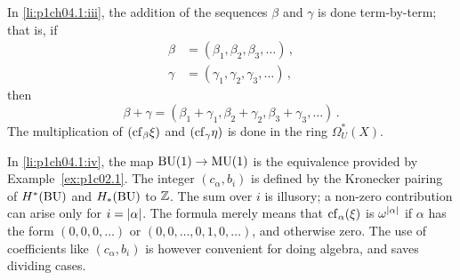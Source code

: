 \documentclass[../main]{subfiles}
\begin{document}
\begin{explanation}
In \ref{li:p1ch04.1:iii}, the addition of the sequences $\beta$ and $\gamma$ is done term-by-term; 
that is, if 
\begin{equation*}
\begin{split}
	\beta &= (\beta_1, \beta_2, \beta_3, \ldots)\,,\\
	\gamma &= (\gamma_1, \gamma_2, \gamma_3, \ldots)\,,
\end{split}
\end{equation*}
then
\begin{equation*}
	\beta + \gamma = (\beta_1 + \gamma_1, \beta_2 + \gamma_2, \beta_3 + \gamma_3, \ldots)\,.
\end{equation*} 
The multiplication of $(\mathrm{cf}_\beta \xi)$ and $(\mathrm{cf}_\gamma \eta)$ is done in the ring $\Omega_U^\ast(X)$.

In \ref{li:p1ch04.1:iv}, the map $\mathrm{BU}(1) \to \mathrm{MU}(1)$ is the equivalence provided by Example~\ref{ex:p1c02.1}. 
The integer $(c_\alpha, b_i)$ is defined by the Kronecker pairing of $H^\ast(\operatorname{BU})$ and $H_\ast(\operatorname{BU})$ to $\mathbb{Z}$. 
The sum over $i$ is illusory; 
a non-zero contribution can arise only for $i = \lvert\alpha\rvert$. 
The formula merely means that $\mathrm{cf}_\alpha(\xi)$ is $\omega^{\lvert\alpha\rvert}$ if $\alpha$ has the form $(0, 0, 0, \ldots)$ or $(0, 0, \ldots, 0, 1, 0, \ldots)$, and otherwise zero. 
The use of coefficients like $(c_\alpha, b_i)$ is however convenient for doing algebra, and saves dividing cases.
\end{explanation}
\end{document}
